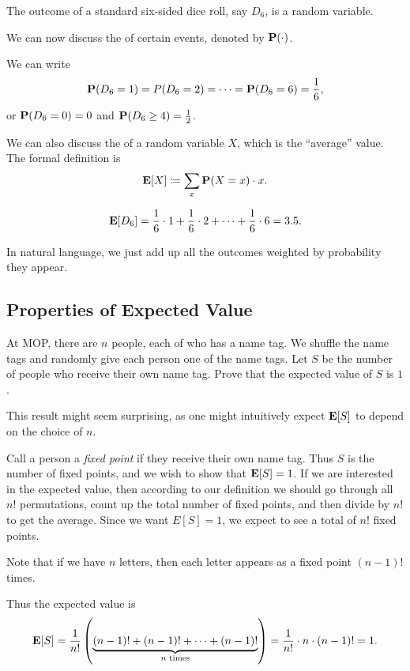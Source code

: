 \begin{example}
The outcome of a standard six-sided dice roll, say $D_6$, is a random variable.
\end{example}

We can now discuss the  of certain events, denoted by $\mathbf P(\cdot)$.

\begin{example}
We can write
\[\mathbf P(D_6=1)=P(D_6=2)=\cdots=\mathbf P(D_6=6)=\frac{1}{6},\]
or $\mathbf P(D_6=0)=0$ and $\mathbf P(D_6\ge4)=\frac{1}{2}$.
\end{example}

We can also discuss the  of a random variable $X$, which is the ``average'' value. The formal definition is
\begin{equation}
\mathbf E[X]\coloneqq\sum_x\mathbf P(X=x)\cdot x.
\end{equation}

\begin{example}
\[\mathbf E[D_6]=\frac{1}{6}\cdot1+\frac{1}{6}\cdot2+\cdots+\frac{1}{6}\cdot6=3.5.\]
\end{example}

In natural language, we just add up all the outcomes weighted by probability they appear.

\subsection{Properties of Expected Value}
\begin{example}
At MOP, there are $n$ people, each of who has a name tag. We shuffle the name tags and randomly give each person one of the name tags. Let $S$ be the number of people who receive their own name tag. Prove that the expected value of $S$ is $1$.
\end{example}

\begin{solution}
This result might seem surprising, as one might intuitively expect $\mathbf E[S]$ to depend on the choice of $n$.

Call a person a \emph{fixed point} if they receive their own name tag. Thus $S$ is the number of fixed points, and we wish to show that $\mathbf E[S]=1$. If we are interested in the expected value, then according to our definition we should go through all $n!$ permutations, count up the total number of fixed points, and then divide by $n!$ to get the average. Since we want $E[S]=1$, we expect to see a total of $n!$ fixed points.

Note that if we have $n$ letters, then each letter appears as a fixed point $(n-1)!$ times.

Thus the expected value is
\[\mathbf E[S]=\frac{1}{n!}\left(\underbrace{(n-1)!+(n-1)!+\cdots+(n-1)!}_{n\text{ times}}\right)=\frac{1}{n!}\cdot n\cdot(n-1)!=1.\]
\end{solution}

